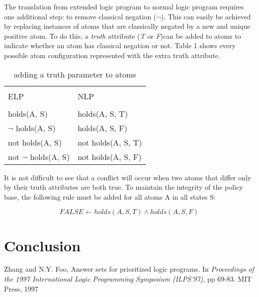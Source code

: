 \documentclass{llncs}
\begin{document}
        The translation from extended logic program to normal logic program
        requires one additional step: to remove classical negation ($\lnot$).
        This can easily be achieved by replacing instances of atoms that are
        classically negated by a new and unique positive atom. To do this,
        a \emph{truth} attribute (\emph{T} or \emph{F})can be added to atoms
        to indicate whether an atom has classical negation or not. Table 1 shows
        every possible atom configuration represented with the extra truth
        attribute.

        \begin{table}
         \caption{adding a truth parameter to atoms}
          \begin{tabular}{ll}
            \hline \\
            ELP & NLP \\
            \hline \\
            holds(A, S) & holds(A, S, T) \\
            $\lnot$ holds(A, S) & holds(A, S, F) \\
            not holds(A, S) & not holds(A, S, T) \\
            not $\lnot$ holds(A, S) & not holds(A, S, F) \\
            \hline
          \end{tabular}
        \end{table}

        It is not difficult to see that a conflict will occur when two atoms
        that differ only by their truth attributes are both true. To maintain
        the integrity of the policy base, the following rule must be added 
        for all atoms A in all states S:

        \begin{equation}
          FALSE \leftarrow holds(A, S, T) \land holds(A, S, F)
        \end{equation}

  \section{Conclusion}

  \begin{thebibliography}{5}

      Zhang and N.Y. Foo,
      Answer sets for prioritized logic programs.
      In {\em Proceedings of the 1997 International Logic Programming
      Symposium (ILPS'97)},
      pp 69-83. 
      MIT Press, 1997

  \end{thebibliography}
\end{document}
